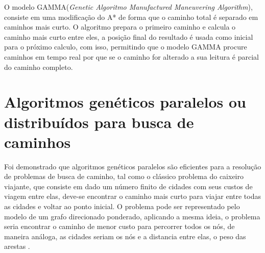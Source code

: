 \begin{minipage}{\linewidth}
\end{minipage}

O modelo GAMMA(\textit{Genetic Algoritmo Manufactured Maneuvering Algorithm}), consiste em uma modificação do A* de forma que o caminho total é separado em caminhos mais curto. O algoritmo prepara o primeiro caminho e calcula o caminho mais curto entre eles, a posição final do resultado é usada como inicial para o próximo calculo, com isso, permitindo que o modelo GAMMA procure caminhos em tempo real por que se o caminho for alterado a sua leitura é parcial do caminho completo.\cite{Ryan}



\section{Algoritmos genéticos paralelos ou distribuídos para busca de caminhos}

Foi demonstrado que algoritmos genéticos paralelos são eficientes para a resolução de problemas de busca de caminho, tal como o clássico problema do caixeiro viajante, que consiste em dado um número finito de cidades com seus custos de viagem entre elas, deve-se encontrar o caminho mais curto para viajar entre todas as cidades e voltar ao ponto inicial. O problema pode ser representado pelo modelo de um grafo direcionado ponderado, aplicando a mesma ideia, o problema seria encontrar o caminho de menor custo para percorrer todos os nós, de maneira análoga, as cidades seriam os nós e a distancia entre elas, o peso das arestas \cite{Jason}\cite{Alaoui}\cite{Heinz}.

